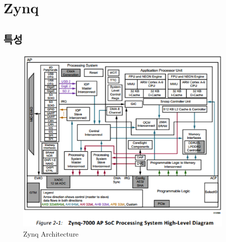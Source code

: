 \documentclass[11pt
  , a4paper
  , article
  , oneside
]{memoir}
\begin{document}
\hfil\break
\chapter{Zynq}

\section{특성}

\begin{figure}[h!]
	\centering
	\includegraphics[width=0.95\textwidth, height=0.8\textwidth]{./images/zynq_arch.eps}
	\caption{Zynq Architecture}
	\label{fig:zynq_arch} 
\end{figure}


\clearpage



\end{document}
